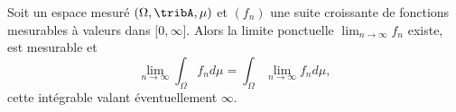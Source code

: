 \begin{theorem} \label{ThoRRDooFUvEAN}
    Soit un espace mesuré \( (\Omega,\tribA,\mu)\) et \( (f_n)\) une suite croissante de fonctions mesurables à valeurs dans \( \mathopen[ 0 , \infty \mathclose]\). Alors la limite ponctuelle \( \lim_{n\to \infty} f_n\) existe, est mesurable et
    \begin{equation}    \label{EqFHqCmLV}
        \lim_{n\to \infty} \int_{\Omega}f_nd\mu= \int_{\Omega}\lim_{n\to \infty} f_nd\mu,
    \end{equation}
    cette intégrable valant éventuellement \( \infty\).
\end{theorem}

